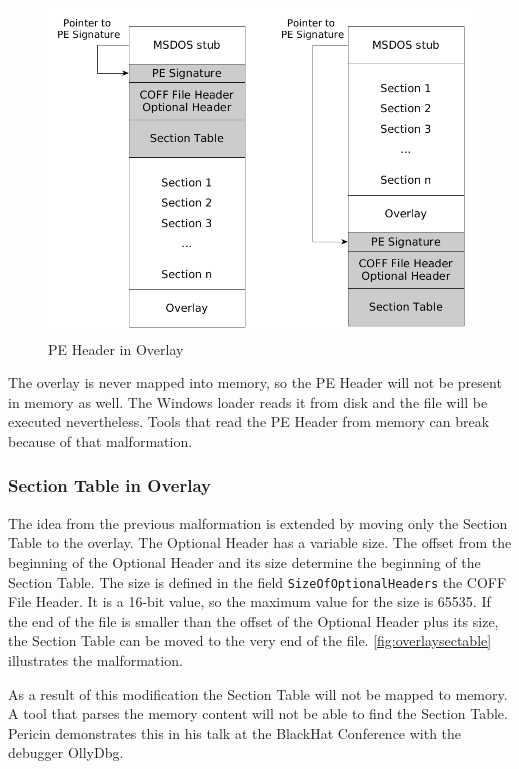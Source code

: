 \begin{figure}
\includegraphics[width=.98\textwidth, height=.60\textheight,keepaspectratio]{graphics/overlayheader}
\caption{PE Header in Overlay }
\label{fig:overlayheader} 
\end{figure}

The overlay is never mapped into memory, so the PE Header will not be present in memory as well. The Windows loader reads it from disk and the file will be executed nevertheless. Tools that read the PE Header from memory can break because of that malformation.

\subsubsection*{Section Table in Overlay}

The idea from the previous malformation is extended by moving only the Section Table to the overlay. The Optional Header has a variable size. The offset from the beginning of the Optional Header and its size determine the beginning of the Section Table. The size is defined in the field \texttt{SizeOfOptionalHeaders} the COFF File Header. It is a 16-bit value, so the maximum value for the size is 65535. If the end of the file is smaller than the offset of the Optional Header plus its size, the Section Table can be moved to the very end of the file. \autoref{fig:overlaysectable} illustrates the malformation.

As a result of this modification the Section Table will not be mapped to memory. A tool that parses the memory content will not be able to find the Section Table. Pericin demonstrates this in his talk at the BlackHat Conference with the debugger OllyDbg. \cite[min.\thinspace{}14:45]{vuksan11} 

